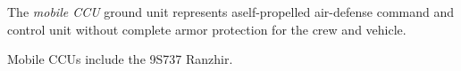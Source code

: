 
The \emph{mobile CCU} ground unit represents aself-propelled air-defense command and control unit without complete armor protection for the crew and vehicle.

Mobile CCUs include the 9S737 Ranzhir.